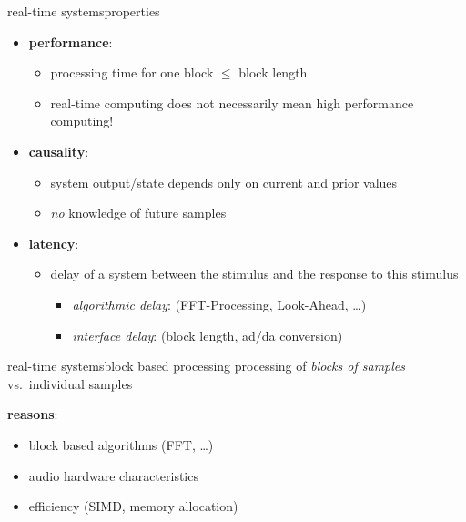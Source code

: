 	\begin{frame}{real-time systems}{properties}
		\begin{itemize}
			\item	\textbf{performance}:
				\begin{itemize}
					\item	processing time for one block $\leq$ block length
                    \pause
                    \item   real-time computing does not necessarily mean high performance computing!
				\end{itemize}
			\bigskip
            \pause
			\item	\textbf{causality}:
				\begin{itemize}
                    \item   system output/state depends only on current and prior values
					\item	\textit{no} knowledge of future samples
				\end{itemize}
			\bigskip
			\pause
			\item	\textbf{latency}:
				\begin{itemize}
					\item	delay of a system between the stimulus and the response to
this stimulus
						\begin{itemize}
							\item	\textit{algorithmic delay}: (FFT-Processing, Look-Ahead, \ldots)
							\item	\textit{interface delay}: (block length, ad/da conversion)
						\end{itemize}
				\end{itemize}
		\end{itemize}
	\end{frame}

	\begin{frame}{real-time systems}{block based processing}
		processing of \textit{blocks of samples} vs.\ individual samples
		
		\begin{figure}
			\centering
			
		\end{figure}
		\pause
		\vspace{-5mm}
		\textbf{reasons}:
		\begin{itemize}
			\item	block based algorithms (FFT, \ldots)
			\item	audio hardware characteristics
			\item	efficiency (SIMD, memory allocation)
		\end{itemize}
	\end{frame}
